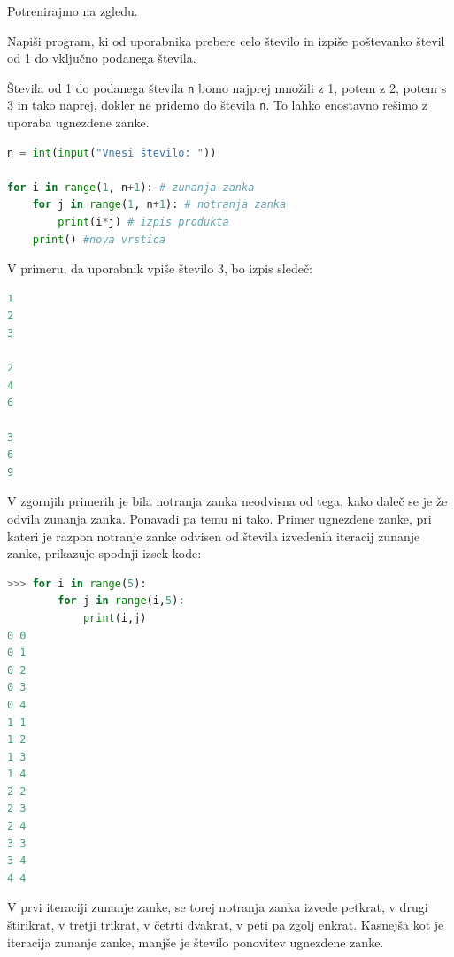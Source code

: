 Potrenirajmo na zgledu.

\begin{zgled}
Napiši program, ki od uporabnika prebere celo število in izpiše poštevanko števil od 1 do vključno podanega števila.
\end{zgled}
\begin{resitev}
Števila od 1 do podanega števila \texttt{n} bomo najprej množili z 1, potem z 2, potem s 3 in tako naprej, dokler ne pridemo do števila \texttt{n}. To lahko enostavno rešimo z uporaba ugnezdene zanke.
\begin{lstlisting}[language=Python]
n = int(input("Vnesi število: "))

for i in range(1, n+1): # zunanja zanka
    for j in range(1, n+1): # notranja zanka
        print(i*j) # izpis produkta
    print() #nova vrstica
\end{lstlisting}
V primeru, da uporabnik vpiše število 3, bo izpis sledeč:
\begin{lstlisting}[language=Python]
1
2
3

2
4
6

3
6
9
\end{lstlisting}
\end{resitev}

V zgornjih primerih je bila notranja zanka neodvisna od tega, kako daleč se je že odvila zunanja zanka. Ponavadi pa temu ni tako. Primer ugnezdene zanke, pri kateri je razpon notranje zanke odvisen od števila izvedenih iteracij zunanje zanke, prikazuje spodnji izsek kode:
\begin{lstlisting}[language=Python]
>>> for i in range(5):
        for j in range(i,5):
            print(i,j)
0 0
0 1
0 2
0 3
0 4
1 1
1 2
1 3
1 4
2 2
2 3
2 4
3 3
3 4
4 4
\end{lstlisting}
V prvi iteraciji zunanje zanke, se torej notranja zanka izvede petkrat, v drugi štirikrat, v tretji trikrat, v četrti dvakrat, v peti pa zgolj enkrat. Kasnejša kot je iteracija zunanje zanke, manjše je število ponovitev ugnezdene zanke. 

